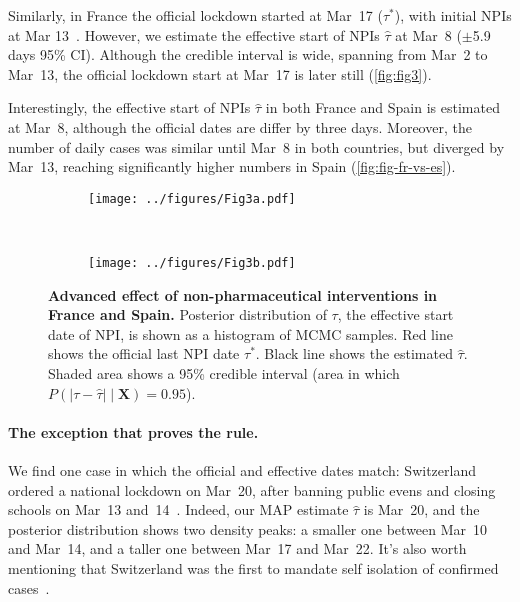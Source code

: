 \documentclass[12pt]{extarticle}
\let\vec\mathbf
\begin{document}
Similarly, in France the official lockdown started at Mar~17 ($\tau^*$), with initial NPIs at Mar 13~\citep{Flaxman2020}. 
However, we estimate the effective start of NPIs $\hat{\tau}$ at Mar~8 ($\pm$5.9 days 95\% CI). Although the credible interval is wide, spanning from Mar~2 to Mar~13, the official lockdown start at Mar~17 is later still (\autoref{fig:fig3}).

Interestingly, the effective start of NPIs $\hat{\tau}$ in both France and Spain is estimated at Mar~8, although the official dates are differ by three days. Moreover, the number of daily cases was similar until Mar~8 in both countries, but diverged by Mar~13, reaching significantly higher numbers in Spain (\autoref{fig:fig-fr-vs-es}).



\begin{figure}[h]
    \centering
    \begin{subfigure}{0.45\textwidth}
        \texttt{[image: ../figures/Fig3a.pdf]}
    \end{subfigure}
    ~
    \begin{subfigure}{0.45\textwidth}
        \texttt{[image: ../figures/Fig3b.pdf]}
    \end{subfigure}
    \caption{
    \textbf{Advanced effect of non-pharmaceutical interventions in France and Spain.}
    Posterior distribution of $\tau$, the effective start date of NPI, is shown as a histogram of MCMC samples. Red line shows the official last NPI date $\tau^*$. Black line shows the estimated $\hat{\tau}$. Shaded area shows a 95\% credible interval (area in which $P(|\tau - \hat{\tau}| \mid \vec{X}) = 0.95$). 
	}
	\label{fig:fig3}
\end{figure}


\paragraph*{The exception that proves the rule.}
We find one case in which the official and effective dates match: Switzerland ordered a national lockdown on Mar~20, after banning public evens and closing schools on Mar~13 and~14~\citep{Flaxman2020}.
Indeed, our MAP estimate $\hat{\tau}$ is Mar~20, and the posterior distribution shows two density peaks: a smaller one between Mar~10 and Mar~14, and a taller one between Mar~17 and Mar~22. It's also worth mentioning that Switzerland was the first to mandate self isolation of confirmed cases~\citep{Flaxman2020}.
\end{document}
